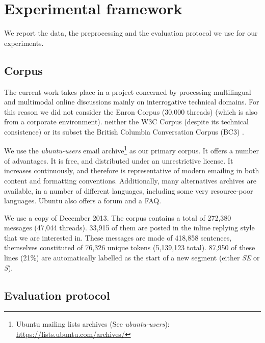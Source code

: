 \section{Experimental framework}
\label{sec:experimentalframework}
We report the data, the preprocessing and the evaluation protocol we use for our experiments.

\subsection{Corpus}

The current work takes place in a project concerned by processing multilingual and multimodal online discussions mainly on interrogative technical domains. 
For this reason we did not consider the Enron Corpus (30,000 threads) \cite{klimt:2004:enron} (which is also from a corporate environment). 
neither the W3C Corpus (despite its technical consistence) or its subset the British Columbia Conversation Corpus (BC3) \cite{ulrich:2008:bc3}.

We use the \textit{ubuntu-users} email archive\footnote{Ubuntu mailing lists archives (See \textit{ubuntu-users}): \url{https://lists.ubuntu.com/archives/}} as our primary corpus. It offers a number of advantages. It is free, and distributed under an unrestrictive license. It increases continuously, and therefore is representative of modern emailing in both content and formatting conventions. Additionally, many alternatives archives are available, in a number of different languages, including some very resource-poor languages. Ubuntu also offers a forum and a FAQ. 

We use a copy of December 2013.
The corpus contains a total of 272,380 messages (47,044 threads). 33,915 of them are posted in the inline replying style that we are interested in. These messages are made of 418,858 sentences, themselves constituted of 76,326 unique tokens (5,139,123 total). 87,950 of these lines (21\%) are automatically labelled as the start of a new segment (either \textit{SE} or \textit{S}).
\subsection{Evaluation protocol}

